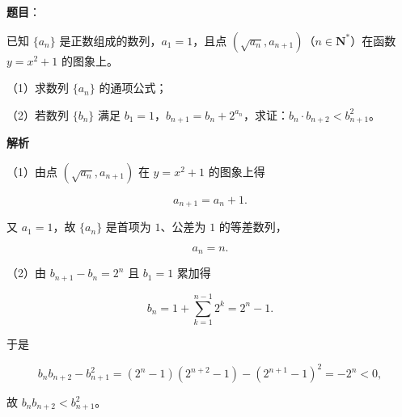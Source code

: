 \begin{answer}

\textbf{题目}：

已知 $\{a_n\}$ 是正数组成的数列，$a_1=1$，且点 $(\sqrt{a_n},a_{n+1})$（$n\in\mathbf N^*$）在函数 $y=x^2+1$ 的图象上。

（1）求数列 $\{a_n\}$ 的通项公式；

（2）若数列 $\{b_n\}$ 满足 $b_1=1$，$b_{n+1}=b_n+2^{a_n}$，求证：$b_n\cdot b_{n+2}<b_{n+1}^2$。

\textbf{解析}

（1）由点 $(\sqrt{a_n},a_{n+1})$ 在 $y=x^2+1$ 的图象上得

\nopagebreak[4]
\[a_{n+1}=a_n+1.\]

又 $a_1=1$，故 $\{a_n\}$ 是首项为 $1$、公差为 $1$ 的等差数列，

\nopagebreak[4]
\[a_n=n.\]

（2）由 $b_{n+1}-b_n=2^n$ 且 $b_1=1$ 累加得

\nopagebreak[4]
\[b_n=1+\sum_{k=1}^{n-1}2^k=2^n-1.\]

于是

\nopagebreak[4]
\[b_nb_{n+2}-b_{n+1}^2=(2^n-1)(2^{n+2}-1)-(2^{n+1}-1)^2=-2^n<0,\]

故 $b_nb_{n+2}<b_{n+1}^2$。


\end{answer}
